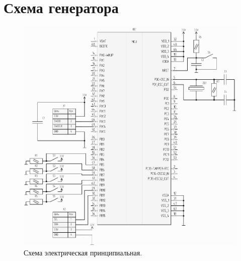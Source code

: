 \section{Схема генератора}
\begin{figure}[h]
    \centering
    \includegraphics[width=1.0\textwidth]{../image/scheme-cropped.pdf}
    \caption{Схема электрическая принципиальная.}
\end{figure}

